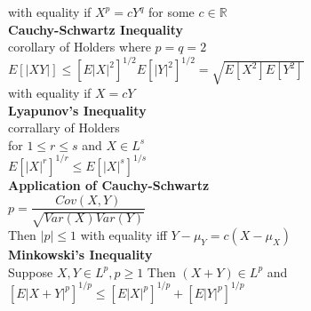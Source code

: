 \documentclass[openany]{book}
\begin{document}
with equality if $X^p=cY^q$ for some $c \in \mathbb{R}$\\
\textbf{Cauchy-Schwartz Inequality}\\
corollary of Holders where $p=q=2$\\
$E[|XY|]\leq [E|X|^2]^{1/2}E[|Y|^2]^{1/2}=\sqrt{E[X^2]E[Y^2]}$\\
with equality if $X=cY$\\
\textbf{Lyapunov's Inequality}\\
corrallary of Holders\\
for $1\leq r\leq s$ and $X\in L^s$\\
$E[|X|^r]^{1/r}\leq E[|X|^s]^{1/s}$\\
\textbf{Application of Cauchy-Schwartz}\\
$p=\dfrac{Cov(X,Y)}{\sqrt{Var(X)Var(Y)}}$\\
Then $|p|\leq 1$ with equality iff $Y-\mu_Y=c(X-\mu_X)$\\
\textbf{Minkowski's Inequality}\\
Suppose $X,Y \in L^p, p\geq 1$ Then $(X+Y)\in L^p$ and\\
$[E|X+Y|^p]^{1/p}\leq [E|X|^p]^{1/p}+[E|Y|^p]^{1/p}$\\
\end{document}
